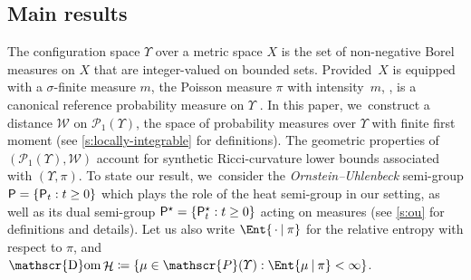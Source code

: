 \documentclass[10pt]{amsart}
\theoremstyle{definition}
\theoremstyle{remark}
\DeclarePairedDelimiter{\set}{\lbrace}{\rbrace}
\newcommand{\given}[1][]{%
\nonscript\:#1\vert
\allowbreak
\nonscript\:
\mathopen{}}
\DeclareMathOperator{\ent}{\mathcal{H}}
\DeclareMathOperator{\dom}{\mathscr{D}om}
\begin{document}
\subsection{Main results}
The configuration space $\varUpsilon$ over a metric space $X$ is the set of non-negative Borel measures on $X$ that are integer-valued on bounded sets.
Provided~$X$ is equipped with a $\sigma$-finite measure $m$, the Poisson measure $\pi$ with intensity~$m$, \eg \cite[Ch.\,3]{LastPenrose}, is a canonical reference probability measure on $\varUpsilon$ .
In this paper, we~construct a distance $\mathcal{W}$ on $\mathscr{P}_{1}(\varUpsilon)$, the space of probability measures over $\varUpsilon$ with finite first moment (see \cref{s:locally-integrable} for definitions).
The geometric properties of $(\mathscr{P}_{1}(\varUpsilon), \mathcal{W})$ account for synthetic Ricci-curvature lower bounds associated with $(\varUpsilon, \pi)$.
To state our result, we~consider the \emph{Ornstein--Uhlenbeck} semi-group $\mathsf{P} = \set{ \mathsf{P}_{t} : t \geq 0 }$ which plays the role of the heat semi-group in our setting, as well as its dual semi-group $\mathsf{P}^{\star} = \set{ \mathsf{P}^{\star}_{t} : t \geq 0 }$ acting on measures (see \cref{s:ou} for definitions and details).
Let us also write $\Ent{\,\cdot \given \pi}$ for the relative entropy with respect to $\pi$, and $\dom \ent \coloneq \set{ \mu \in \mathscr{P}(\varUpsilon) : \Ent{ \mu \given \pi } < \infty }$.
\end{document}
